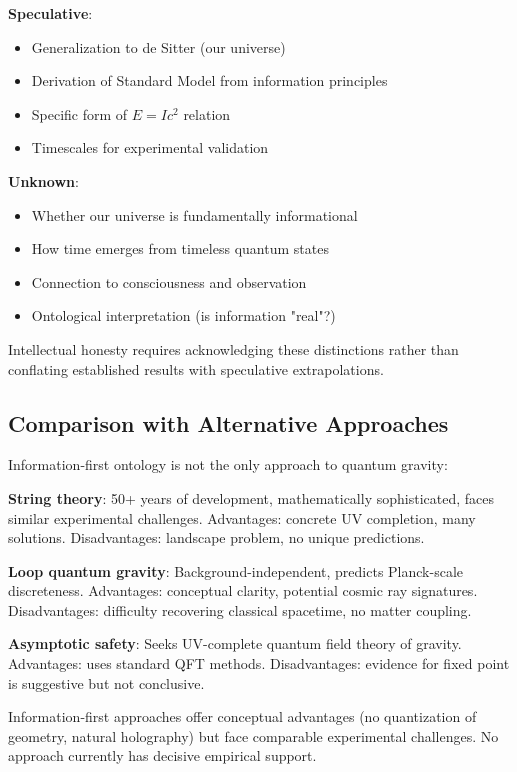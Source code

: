 \documentclass[12pt,twocolumn]{article}
\theoremstyle{definition}
\theoremstyle{remark}
\begin{document}
\textbf{Speculative}:
\begin{itemize}
\item Generalization to de Sitter (our universe)
\item Derivation of Standard Model from information principles
\item Specific form of $E = Ic^2$ relation
\item Timescales for experimental validation
\end{itemize}

\textbf{Unknown}:
\begin{itemize}
\item Whether our universe is fundamentally informational
\item How time emerges from timeless quantum states
\item Connection to consciousness and observation
\item Ontological interpretation (is information "real"?)
\end{itemize}

Intellectual honesty requires acknowledging these distinctions rather than conflating established results with speculative extrapolations.

\subsection{Comparison with Alternative Approaches}

Information-first ontology is not the only approach to quantum gravity:

\textbf{String theory}: 50+ years of development, mathematically sophisticated, faces similar experimental challenges. Advantages: concrete UV completion, many solutions. Disadvantages: landscape problem, no unique predictions.

\textbf{Loop quantum gravity}: Background-independent, predicts Planck-scale discreteness. Advantages: conceptual clarity, potential cosmic ray signatures. Disadvantages: difficulty recovering classical spacetime, no matter coupling.

\textbf{Asymptotic safety}: Seeks UV-complete quantum field theory of gravity. Advantages: uses standard QFT methods. Disadvantages: evidence for fixed point is suggestive but not conclusive.

Information-first approaches offer conceptual advantages (no quantization of geometry, natural holography) but face comparable experimental challenges. No approach currently has decisive empirical support.
\end{document}
